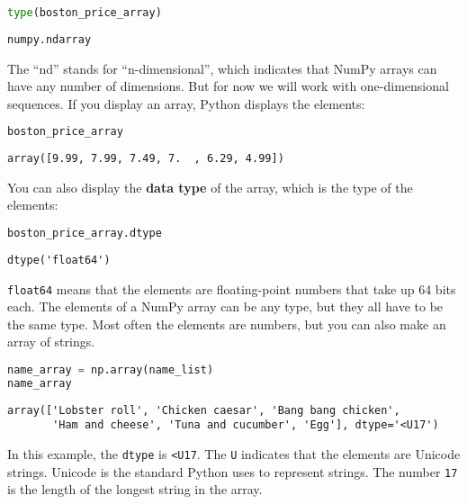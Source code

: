 \documentclass[
]{book}
\newcommand{\passthrough}[1]{#1}
\begin{document}
\begin{lstlisting}[language=Python]
type(boston_price_array)
\end{lstlisting}

\begin{lstlisting}
numpy.ndarray
\end{lstlisting}

The ``nd'' stands for ``n-dimensional'', which indicates that NumPy
arrays can have any number of dimensions. But for now we will work with
one-dimensional sequences. If you display an array, Python displays the
elements:

\begin{lstlisting}[language=Python]
boston_price_array
\end{lstlisting}

\begin{lstlisting}
array([9.99, 7.99, 7.49, 7.  , 6.29, 4.99])
\end{lstlisting}

You can also display the \textbf{data type} of the array, which is the
type of the elements:

\begin{lstlisting}[language=Python]
boston_price_array.dtype
\end{lstlisting}

\begin{lstlisting}
dtype('float64')
\end{lstlisting}

\passthrough{\lstinline!float64!} means that the elements are
floating-point numbers that take up 64 bits each. The elements of a
NumPy array can be any type, but they all have to be the same type. Most
often the elements are numbers, but you can also make an array of
strings.

\begin{lstlisting}[language=Python]
name_array = np.array(name_list)
name_array
\end{lstlisting}

\begin{lstlisting}
array(['Lobster roll', 'Chicken caesar', 'Bang bang chicken',
       'Ham and cheese', 'Tuna and cucumber', 'Egg'], dtype='<U17')
\end{lstlisting}

In this example, the \passthrough{\lstinline!dtype!} is
\passthrough{\lstinline!<U17!}. The \passthrough{\lstinline!U!}
indicates that the elements are Unicode strings. Unicode is the standard
Python uses to represent strings. The number
\passthrough{\lstinline!17!} is the length of the longest string in the
array.
\end{document}

